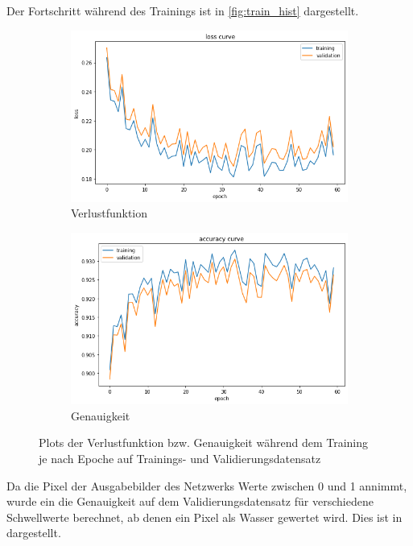 Der Fortschritt während des Trainings ist in \autoref{fig:train_hist} dargestellt.

\begin{figure}
    \centering
    \begin{subfigure}{0.45\textwidth}
        \centering
        \includegraphics[width=\textwidth]{images/loss_curve.png}
        \caption{Verlustfunktion}
        \label{fig:loss_curve}
    \end{subfigure}
    \begin{subfigure}{0.45\textwidth}
        \centering
        \includegraphics[width=\textwidth]{images/acc_curve.png}
        \caption{Genauigkeit}
        \label{fig:acc_curve}
    \end{subfigure}
    \caption{Plots der Verlustfunktion bzw. Genauigkeit während dem Training je nach Epoche auf Trainings- und Validierungsdatensatz}
    \label{fig:train_hist}
\end{figure}

Da die Pixel der Ausgabebilder des Netzwerks Werte zwischen 0 und 1 annimmt, wurde ein die Genauigkeit auf dem Validierungsdatensatz
für verschiedene Schwellwerte berechnet, ab denen ein Pixel als Wasser gewertet wird.
Dies ist in \label{fig:threshold} dargestellt.

